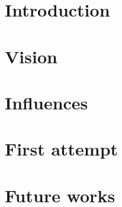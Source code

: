 \documentclass[9pt, aspectratio=169]{beamer}
\begin{document}
\begin{frame}[plain] \titlepage \end{frame}
\section{Introduction}

\section{Vision}

\section{Influences}

\section{First attempt}

\section{Future works}

\end{document}
